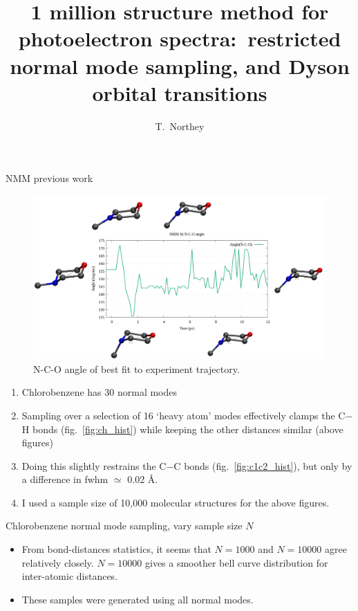 \documentclass{beamer}
\title{1 million structure method for photoelectron spectra:\ restricted normal mode sampling, and Dyson orbital transitions}
\author{T.\ Northey}
\begin{document}
\begin{frame}[plain]
    \maketitle
\end{frame}
\begin{frame}{NMM previous work}
	\begin{figure}[H]
	\centering
		\includegraphics[width=\textwidth]{geomovie_ppt_slide.png}
		\caption{N-C-O angle of best fit to experiment trajectory.}
		\label{fig:geomovie-ppt-slide}
	\end{figure}
	
\end{frame}

\begin{frame}
	\begin{enumerate}
		\item Chlorobenzene has 30 normal modes
		\item Sampling over a selection of 16 `heavy atom' modes effectively clamps the C$-$H bonds (fig.\ \ref{fig:ch_hist}) while keeping the other distances similar (above figures)
		\item Doing this slightly restrains the C$-$C bonds (fig.\ \ref{fig:c1c2_hist}), but only by a difference in fwhm $\simeq$ 0.02 \AA.
		\item I used a sample size of 10,000 molecular structures for the above figures.
	\end{enumerate}
\end{frame}

\begin{frame}{Chlorobenzene normal mode sampling, vary sample size $N$}

\begin{itemize}
	\item From bond-distances statistics, it seems that $N=1000$ and $N=10000$ agree relatively closely. $N=10000$ gives a smoother bell curve distribution for inter-atomic distances.
	\item These samples were generated using all normal modes.
\end{itemize}
\end{frame}
\end{document}
